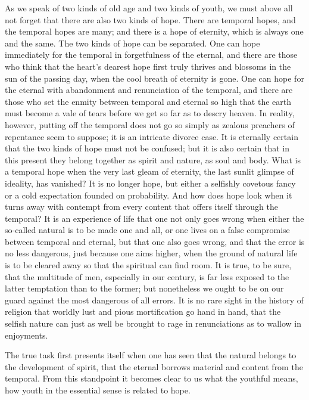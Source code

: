 \documentclass[12pt,a4paper,openany]{book}
\newcommand{\opage}[1]{\marginnote{\footnotesize\textit{[#1]}}}
\begin{document}
As we speak of two kinds of old age and two kinds of
youth, we must above all not forget that there are also
two kinds of hope. There are temporal hopes, and the
temporal hopes are many; and there is a hope of eternity,
which is always one and the same. The two kinds of hope
can be separated. One can hope immediately for the
temporal in forgetfulness of the eternal, and there are
those who think that the heart's dearest hope first truly thrives
and blossoms in the sun of the passing day, when the cool breath
of eternity is gone. One can hope for the eternal with
abandonment and renunciation of the temporal, and there are
those who set the enmity between temporal and eternal
so high that the earth must become a vale of tears before we
get so far as to descry heaven. In
\setcounter{footnote}{0}%
\opage{20}reality, however, putting off the temporal does not go so simply
as zealous preachers of repentance seem to suppose; it
is an intricate divorce case. It is eternally certain that the
two kinds of hope must not be confused; but it is also
certain that in this present they belong together as
spirit and nature, as soul and body. What is a
temporal hope when the very last gleam of eternity,
the last sunlit glimpse of ideality, has vanished? It is
no longer hope, but either a selfishly covetous
fancy or a cold expectation founded on probability.
And how does hope look when
it turns away with contempt from every content
that offers itself through the temporal? It is an
experience of life that one not only goes wrong when either
the so-called natural is to be made one and all, or
one lives on a false compromise between temporal and eternal,
but that one also goes wrong, and that the error is no
less dangerous, just because one aims higher, when the ground of
natural life is to be cleared away so that the spiritual can
find room. It is true, to be sure, that the multitude of men,
especially in our century, is far less exposed
to the latter temptation than to the former; but nonetheless
we ought to be on our guard against the most dangerous
of all errors. It is no rare sight in the history of religion
that worldly lust and pious mortification
go hand in hand, that the selfish nature can just as
well be brought to rage in renunciations as to
wallow in enjoyments.

The true task first presents itself when one
has seen that the natural belongs to the development of
spirit, that the eternal borrows material and content from the
temporal. From this standpoint it becomes clear to us
\setcounter{footnote}{0}%
\opage{21}what the youthful means, how youth in the
essential sense is related to hope.
\end{document}
